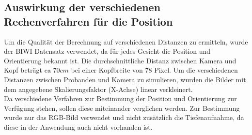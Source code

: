 \subsection{Auswirkung der verschiedenen Rechenverfahren für die Position}
Um die Qualität der Berechnung auf verschiedenen Distanzen zu ermitteln, wurde der BIWI Datensatz \cite{database_Face_Ori} verwendet, da für jedes Gesicht die Position und Orientierung bekannt ist.
Die durchschnittliche Distanz zwischen Kamera und Kopf beträgt ca $70cm$ bei einer Kopfbreite von 78 Pixel. Um die verschiedenen Distanzen zwischen Probanden und Kamera zu simulieren, wurden die Bilder mit dem angegebene Skalierungsfaktor (X-Achse) linear verkleinert.\\
Da verschiedene Verfahren zur Bestimmung der Position und Orientierung zur Verfügung stehen, sollen diese miteinander verglichen werden. Zur Bestimmung wurde nur das RGB-Bild verwendet und nicht zusätzlich die Tiefenaufnahme, da diese in der Anwendung auch nicht vorhanden ist.
